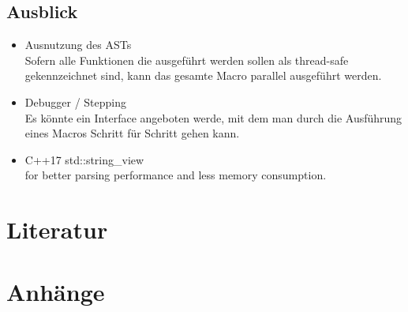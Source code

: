   \subsection{Ausblick}
  \label{sec:Ausblick}
    \begin{itemize}
      \item Ausnutzung des ASTs\\
        Sofern alle Funktionen die ausgeführt werden sollen als thread-safe gekennzeichnet sind, kann das gesamte Macro parallel ausgeführt werden.
      \item Debugger / Stepping\\
        Es könnte ein Interface angeboten werde, mit dem man durch die Ausführung eines Macros Schritt für Schritt gehen kann.
      \item C++17 std::string\_view\\
        for better parsing performance and less memory consumption.
    \end{itemize}


\section{Literatur}
\label{sec:Literatur}
  \nocite{*} %
  \printbibliography[heading=none]

\section{Anhänge}
\label{sec:Anhänge}


